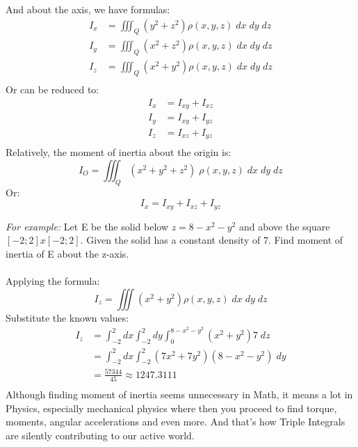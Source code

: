 \documentclass[a4paper]{article}
\begin{document}
And about the axis, we have formulas:\\
\begin{align*}
	I_x & = \iiint_Q (y^2 + z^2) \rho(x,y,z)\;dx\;dy\;dz \\
	I_y & = \iiint_Q (x^2 + z^2) \rho(x,y,z)\;dx\;dy\;dz \\
	I_z & = \iiint_Q (x^2 + y^2) \rho(x,y,z)\;dx\;dy\;dz \\
\end{align*}
Or can be reduced to:
\begin{align*}
	I_x & = I_{xy} + I_{xz} \\
	I_y & = I_{xy} + I_{yz} \\
	I_z & = I_{xz} + I_{yz} \\
\end{align*}
Relatively, the moment of inertia about the origin is:
\begin{equation*}
	I_O = \iiint_Q (x^2 + y^2 + z^2)\;\rho(x,y,z)\;dx\;dy\;dz
\end{equation*}
Or:
\begin{equation*}
	I_x = I_{xy} + I_{xz} + I_{yz}
\end{equation*}


\textit{For example: }Let E be the solid below $z = 8 - x^2 - y^2$ and above the square $[-2;2]x[-2;2]$. Given the solid has a constant density of $7$. Find moment of inertia of E about the z-axis.\\\\
Applying the formula: \\
\begin{equation*}
	I_z = \iiint (x^2 + y^2) \rho(x,y,z)\;dx\;dy\;dz
\end{equation*}
Substitute the known values:
\begin{align*}
	I_z & = \int_{-2}^{2}dx\int_{-2}^{2}dy\int_{0}^{8-x^2-y^2} (x^2 + y^2)7\;dz \\
	    & = \int_{-2}^{2}dx\int_{-2}^{2}(7x^2 + 7y^2)(8-x^2-y^2)\;dy            \\
	    & = \frac{57344}{45} \approx 1247.3111                                  \\
\end{align*}
Although finding moment of inertia seems unnecessary in Math, it means a lot in Physics, especially mechanical physics where then you proceed to find torque, moments, angular accelerations and even more. And that's how Triple Integrals are silently contributing to our active world.
\end{document}
